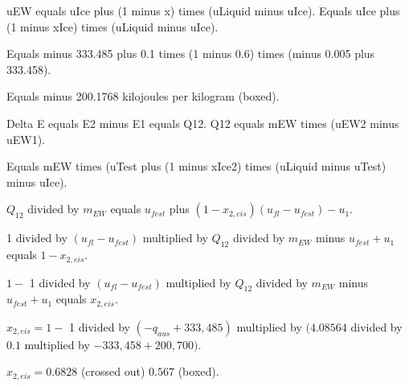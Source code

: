 uEW equals uIce plus (1 minus x) times (uLiquid minus uIce).  
Equals uIce plus (1 minus xIce) times (uLiquid minus uIce).  

Equals minus 333.485 plus 0.1 times (1 minus 0.6) times (minus 0.005 plus 333.458).  

Equals minus 200.1768 kilojoules per kilogram (boxed).  

Delta E equals E2 minus E1 equals Q12.  
Q12 equals mEW times (uEW2 minus uEW1).  

Equals mEW times (uTest plus (1 minus xIce2) times (uLiquid minus uTest) minus uIce).

\( Q_{12} \) divided by \( m_{EW} \) equals \( u_{fest} \) plus \( (1 - x_{2,eis})(u_{fl} - u_{fest}) - u_1 \).

1 divided by \( (u_{fl} - u_{fest}) \) multiplied by \( Q_{12} \) divided by \( m_{EW} \) minus \( u_{fest} + u_1 \) equals \( 1 - x_{2,eis} \).

\( 1 - \) 1 divided by \( (u_{fl} - u_{fest}) \) multiplied by \( Q_{12} \) divided by \( m_{EW} \) minus \( u_{fest} + u_1 \) equals \( x_{2,eis} \).

\( x_{2,eis} = 1 - \) 1 divided by \( (-q_{aus} + 333,485) \) multiplied by \( (4.08564 \) divided by \( 0.1 \) multiplied by \( -333,458 + 200,700) \).

\( x_{2,eis} = 0.6828 \) (crossed out) \( 0.567 \) (boxed).